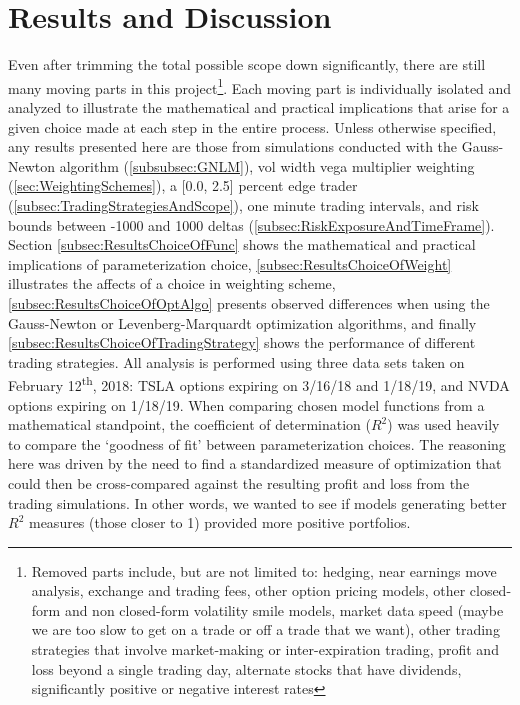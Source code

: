 \documentclass[12pt, a4paper, notitlepage]{article}
\numberwithin{equation}{subsection}
\numberwithin{figure}{subsection}
\numberwithin{table}{subsection}
\newcommand{\newpar}{\newline \newline}
\begin{document}
\newpage
\section{Results and Discussion} \label{sec:Results}
Even after trimming the total possible scope down significantly, there are still many moving parts in this project\footnote{Removed parts include, but are not limited to:  hedging, near earnings move analysis, exchange and trading fees, other option pricing models, other closed-form and non closed-form volatility smile models, market data speed (maybe we are too slow to get on a trade or off a trade that we want), other trading strategies that involve market-making or inter-expiration trading, profit and loss beyond a single trading day, alternate stocks that have dividends, significantly positive or negative interest rates}.  Each moving part is individually isolated and analyzed to illustrate the mathematical and practical implications that arise for a given choice made at each step in the entire process.
\newpar
Unless otherwise specified, any results presented here are those from simulations conducted with the Gauss-Newton algorithm (\ref{subsubsec:GNLM}), vol width vega multiplier weighting (\ref{sec:WeightingSchemes}), a [0.0, 2.5] percent edge trader (\ref{subsec:TradingStrategiesAndScope}), one minute trading intervals, and risk bounds between -1000 and 1000 deltas (\ref{subsec:RiskExposureAndTimeFrame}).
\newpar
Section \ref{subsec:ResultsChoiceOfFunc} shows the mathematical and practical implications of parameterization choice, \ref{subsec:ResultsChoiceOfWeight} illustrates the affects of a choice in weighting scheme, \ref{subsec:ResultsChoiceOfOptAlgo} presents observed differences when using the Gauss-Newton or Levenberg-Marquardt optimization algorithms, and finally \ref{subsec:ResultsChoiceOfTradingStrategy} shows the performance of different trading strategies.  All analysis is performed using three data sets taken on February 12\textsuperscript{th}, 2018:  TSLA options expiring on 3/16/18 and 1/18/19, and NVDA options expiring on 1/18/19.
\newpar
When comparing chosen model functions from a mathematical standpoint, the coefficient of determination ($R^2$) was used heavily to compare the `goodness of fit' between parameterization choices.  The reasoning here was driven by the need to find a standardized measure of optimization that could then be cross-compared against the resulting profit and loss from the trading simulations.  In other words, we wanted to see if models generating better $R^2$ measures (those closer to 1) provided more positive portfolios.
\end{document}
